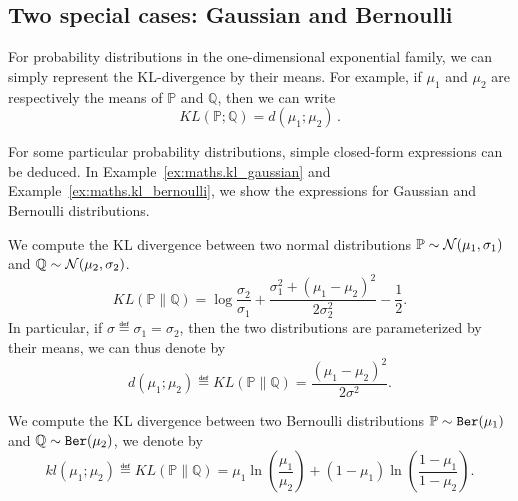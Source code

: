 

\subsection{Two special cases: Gaussian and Bernoulli}\label{app:maths.information.examples}

For probability distributions in the one-dimensional exponential family, we can simply represent the KL-divergence by their means. For example, if $\mu_1$ and $\mu_2$ are respectively the means of $\mathbb{P}$ and $\mathbb{Q}$, then we can write
\[
    KL(\mathbb{P};\mathbb{Q}) = d(\mu_1;\mu_2)\,.
\]

For some particular probability distributions, simple closed-form expressions can be deduced. In Example~\ref{ex:maths.kl_gaussian} and Example~\ref{ex:maths.kl_bernoulli}, we show the expressions for Gaussian and Bernoulli distributions.

\begin{example}\label{ex:maths.kl_gaussian}
\begin{leftbar}[examplebar]
	We compute the KL divergence between two normal distributions $\mathbb{P}\sim\mathcal{N}(\mu_1,\sigma_1)$ and $\mathbb{Q}\sim\mathcal{N}(\mu_2,\sigma_2)$.
	\[
		KL(\mathbb{P} \lVert \mathbb{Q}) = \log \frac{\sigma_2}{\sigma_1} + \frac{\sigma_1^2+(\mu_1-\mu_2)^2}{2\sigma_2^2} - \frac{1}{2}.
	\]
In particular, if $\sigma\eqdef\sigma_1=\sigma_2$, then the two distributions are parameterized by their means, we can thus denote by
	\[
		d(\mu_1;\mu_2) \eqdef KL(\mathbb{P} \lVert \mathbb{Q}) = \frac{(\mu_1-\mu_2)^2}{2\sigma^2}.
	\]
\end{leftbar}
\end{example}

\begin{example}\label{ex:maths.kl_bernoulli}
\begin{leftbar}[examplebar]
    We compute the KL divergence between two Bernoulli distributions $\mathbb{P}\sim\texttt{Ber}(\mu_1)$ and $\mathbb{Q}\sim\texttt{Ber}(\mu_2)$, we denote by
     \[
        kl(\mu_1;\mu_2) \eqdef KL(\mathbb{P} \lVert \mathbb{Q}) =  \mu_1 \ln \left( \frac{\mu_1}{\mu_2} \right) + (1-\mu_1) \ln  \left( \frac{1-\mu_1}{1-\mu_2} \right).
    \]
\end{leftbar}
\end{example}
